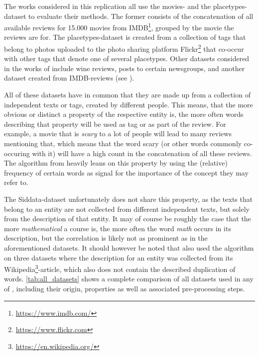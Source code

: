 The works considered in this replication \mainalgos all use the movies- and the  placetypes-dataset to evaluate their methods. The former consists of the concatenation of all available reviews for 15.000 movies from IMDB\footnote{\url{https://www.imdb.com/}}, grouped by the movie the reviews are for. The placetypes-dataset is created from a collection of tags that belong to photos uploaded to the photo sharing platform Flickr\footnote{\url{https://www.flickr.com}} that co-occur with other tags that denote one of several placetypes. Other datasets considered in the works of \mainalgos include wine reviews, posts to certain newsgroups, and another dataset created from IMDB-reviews (see ). 

All of these datasets have in common that they are made up from a collection of independent texts or tags, created by different people. This means, that the more obvious or distinct a property of the respective entity is, the more often words describing that property will be used as tag or as part of the review. For example, a movie that is \emph{scary} to a lot of people will lead to many reviews mentioning that, which means that the word scary (or other words commonly co-occuring with it) will have a high count in the concatenation of all these reviews. The algorithm from \cite{Derrac2015} heavily leans on this property by using the (relative) frequency of certain words as signal for the importance of the concept they may refer to. 

The Siddata-dataset unfortunately does not share this property, as the texts that belong to an entity are not collected from different independent texts, but solely from the description of that entity. It may of course be roughly the case that the more \emph{mathematical} a course is, the more often the word \emph{math} occurs in its description, but the correlation is likely not as prominent as in the aforementioned datasets. It should however be noted that \cite{Alshaikh2020} also used the algorithm on three datasets where the description for an entity was collected from its Wikipedia\footnote{\url{https://en.wikipedia.org/}}-article, which also does not contain the described duplication of words. \autoref{tab:all_datasets} shows a complete comparison of all datasets used in any of \mainalgos, including their origin, properties as well as associated pre-processing steps.



